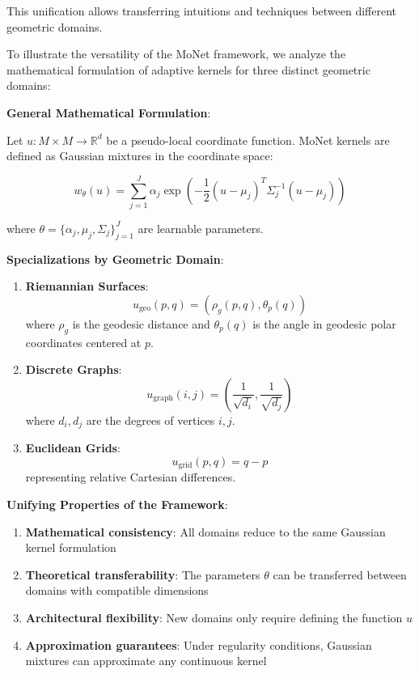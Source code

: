This unification allows transferring intuitions and techniques between different geometric domains.

\begin{example}

To illustrate the versatility of the MoNet framework, we analyze the mathematical formulation of adaptive kernels for three distinct geometric domains:

\textbf{General Mathematical Formulation}:

Let $u: M \times M \to \mathbb{R}^d$ be a pseudo-local coordinate function. MoNet kernels are defined as Gaussian mixtures in the coordinate space:

\begin{equation}
w_\theta(u) = \sum_{j=1}^J \alpha_j \exp\left(-\frac{1}{2}(u - \mu_j)^T \Sigma_j^{-1} (u - \mu_j)\right)
\end{equation}

where $\theta = \{\alpha_j, \mu_j, \Sigma_j\}_{j=1}^J$ are learnable parameters.

\textbf{Specializations by Geometric Domain}:

\begin{enumerate}
    \item \textbf{Riemannian Surfaces}:
    \begin{equation}
    u_{\text{geo}}(p,q) = (\rho_g(p,q), \theta_p(q))
    \end{equation}
    where $\rho_g$ is the geodesic distance and $\theta_p(q)$ is the angle in geodesic polar coordinates centered at $p$.

    \item \textbf{Discrete Graphs}:
    \begin{equation}
    u_{\text{graph}}(i,j) = \left(\frac{1}{\sqrt{d_i}}, \frac{1}{\sqrt{d_j}}\right)
    \end{equation}
    where $d_i, d_j$ are the degrees of vertices $i, j$.

    \item \textbf{Euclidean Grids}:
    \begin{equation}
    u_{\text{grid}}(p,q) = q - p
    \end{equation}
    representing relative Cartesian differences.
\end{enumerate}

\textbf{Unifying Properties of the Framework}:
\begin{enumerate}
    \item \textbf{Mathematical consistency}: All domains reduce to the same Gaussian kernel formulation
    \item \textbf{Theoretical transferability}: The parameters $\theta$ can be transferred between domains with compatible dimensions
    \item \textbf{Architectural flexibility}: New domains only require defining the function $u$
    \item \textbf{Approximation guarantees}: Under regularity conditions, Gaussian mixtures can approximate any continuous kernel
\end{enumerate}
\end{example}

